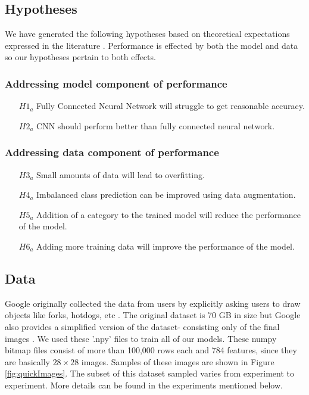 \documentclass[12pt]{article}
\begin{document}
\subsection{Hypotheses}

We have generated the following hypotheses based on theoretical
expectations expressed in the literature \cite{Goodfellow-et-al-2016,
  DeepLear51:online}. Performance is effected by both the model and
data \cite{DeepLear51:online} so our hypotheses pertain to both effects.

\subsubsection{Addressing model component of performance}

\begin{itemize}
  \item[$H1_a$] Fully Connected Neural Network will struggle to get reasonable
    accuracy.
  \item[$H2_a$] CNN should perform better than fully connected neural network.
  \end{itemize}

\subsubsection{Addressing data component of performance}

\begin{itemize}
\item[$H3_a$] Small amounts of data will lead to overfitting.
\item[$H4_a$] Imbalanced class prediction can be improved using data
  augmentation.
\item[$H5_a$] Addition of a category to the trained model will reduce the
  performance of the model.
\item[$H6_a$] Adding more training data will improve the performance of the
  model.
\end{itemize}

\subsection{Data}

Google originally collected the data from users by explicitly asking users to
draw objects like forks, hotdogs, etc \cite{QuickDra91:online}. The original
dataset is 70 GB in size but Google also provides a simplified version of the
dataset- consisting only of the final images \cite{googlecr61:online}. We
used these '.npy' files to train all of our models. These numpy bitmap files
consist of more than 100,000 rows each and 784
features, since they are basically $28 \times 28$ images. Samples of these
images are shown in Figure \ref{fig:quickImages}. The subset of this
dataset sampled varies from experiment to experiment. More details can be
found in the experiments mentioned below.
\end{document}
